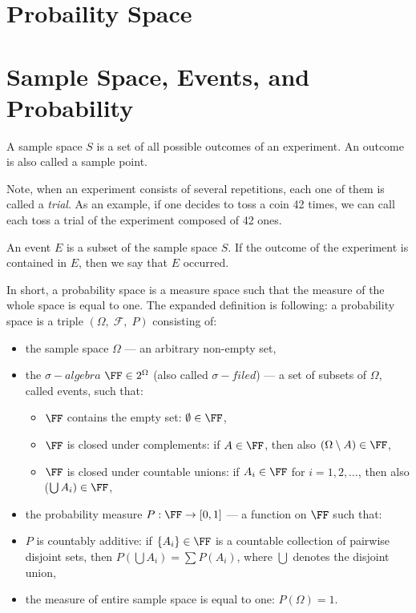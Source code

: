 \section{Probaility Space}
\section{Sample Space, Events, and Probability}
\begin{deff}
	A sample space $S$ is a set of all possible outcomes of an experiment. An outcome is also called a sample point.
\end{deff}
Note, when an experiment consists of several repetitions, each one of them is called a {\em{trial}}. As an example, if one decides to toss a coin 42 times, we can call each toss a trial of the experiment composed of 42 ones.

\begin{deff}
	An event $E$ is a subset of the sample space $S$. If the outcome of the experiment is contained in $E$, then we say that $E$ occurred.
\end{deff}

\begin{deff}\label{def:probability}
In short, a probability space is a measure space such that the measure of the whole space is equal to one. The expanded definition is following: a probability space is a triple $(\Omega,\; \mathcal{F},\; P)$ consisting of:
\begin{itemize}
\item the sample space $\Omega$ --- an arbitrary non-empty set,
\item the $\sigma-algebra$ $\FF \in 2^\Omega$ (also called $\sigma-filed$) --- a set of subsets of $\Omega$, called events, such that:
	\begin{itemize}
	\item $\FF$ contains the empty set: $\emptyset \in \FF$,
	\item $\FF$ is closed under complements: if $A \in \FF$, then also $(\Omega \setminus A) \in \FF$,
	\item $\FF$ is closed under countable unions: if $A_i \in \FF$ for $i=1,2,\ldots$, then also ($\bigcup A_i) \in \FF$,
	\end{itemize}
\item the probability measure $P: \FF \rightarrow [0,1]$ --- a function on $\FF$ such that:
\item $P$ is countably additive: if $\{A_i\} \in \FF$ is a countable collection of pairwise disjoint sets, then $P(\bigcup A_i) = \sum P(A_i)$, where $\bigcup$ denotes the disjoint union,
\item the measure of entire sample space is equal to one: $P(\Omega)=1$.
\end{itemize}
\end{deff}

